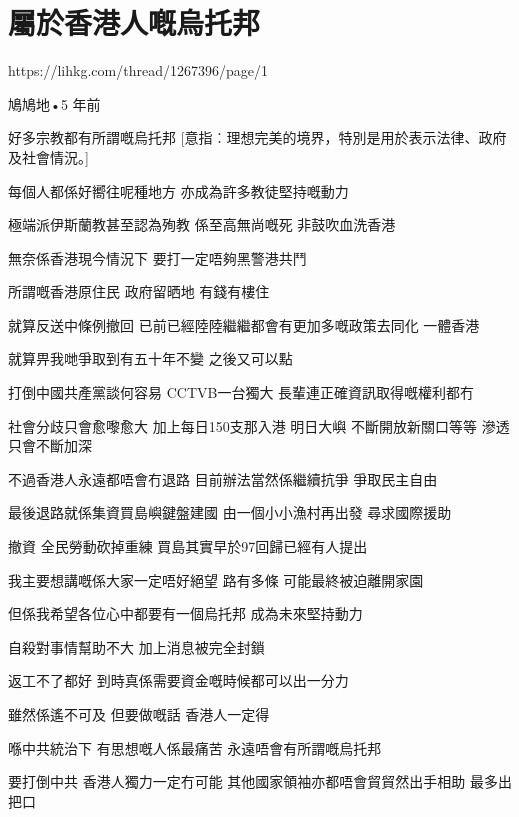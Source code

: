 \chapter{屬於香港人嘅烏托邦}

https://lihkg.com/thread/1267396/page/1

鳩鳩地•5 年前

好多宗教都有所謂嘅烏托邦 [意指︰理想完美的境界，特別是用於表示法律、政府及社會情況。]

每個人都係好嚮往呢種地方 亦成為許多教徒堅持嘅動力

極端派伊斯蘭教甚至認為殉教 係至高無尚嘅死 非鼓吹血洗香港

無奈係香港現今情況下 要打一定唔夠黑警港共鬥

所謂嘅香港原住民 政府留晒地 有錢有樓住

就算反送中條例撤回 已前已經陸陸繼繼都會有更加多嘅政策去同化 一體香港

就算畀我哋爭取到有五十年不變 之後又可以點

打倒中國共產黨談何容易 CCTVB一台獨大 長輩連正確資訊取得嘅權利都冇

社會分歧只會愈嚟愈大 加上每日150支那入港 明日大嶼 不斷開放新關口等等 滲透只會不斷加深

不過香港人永遠都唔會冇退路 目前辦法當然係繼續抗爭 爭取民主自由

最後退路就係集資買島嶼鍵盤建國 由一個小小漁村再出發 尋求國際援助

撤資 全民勞動砍掉重練 買島其實早於97回歸已經有人提出

我主要想講嘅係大家一定唔好絕望 路有多條 可能最終被迫離開家園

但係我希望各位心中都要有一個烏托邦 成為未來堅持動力

自殺對事情幫助不大 加上消息被完全封鎖

返工不了都好 到時真係需要資金嘅時候都可以出一分力

雖然係遙不可及 但要做嘅話 香港人一定得

喺中共統治下 有思想嘅人係最痛苦 永遠唔會有所謂嘅烏托邦

要打倒中共 香港人獨力一定冇可能 其他國家領袖亦都唔會貿貿然出手相助 最多出把口

